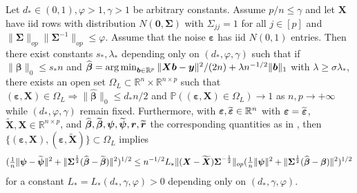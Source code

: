 \documentclass[11pt]{amsart}
\numberwithin{equation}{section}
\numberwithin{equation}{section}
\def\argmin{\mathop{\rm arg\, min}}
\def\argmin{\mathop{\rm arg\, min}}
\def\real{{\mathbb{R}}}
\def\R{{\real}}
\def\P{{\mathbb{P}}}
\def\mathbold{\boldsymbol} %
\def\bb{\mathbold{b}}\def\bhat{\widehat{b}}\def\btil{\widetilde{b}}
\def\br{\mathbold{r}}\def\rhat{\widehat{r}}\def\rtil{\widetilde{r}}\def\rbar{{\overline r}}\def\brbar{{\overline \br}}
\def\bX{\mathbold{X}}\def\hbX{{\widehat{\bX}}}\def\tbX{{\widetilde{\bX}}}\def\bXbar{{\overline \bX}}
\def\by{\mathbold{y}}\def\yhat{\widehat{y}}\def\ytil{\widetilde{y}}\def\ybar{{\overline y}}\def\vby{{\bf y}}
\def\bbeta{\mathbold{\beta}}\def\betahat{\widehat{\beta}}\def\hbeta{\widehat{\beta}}
\def\hbbeta{{{\widehat{\bbeta}}}}
\def\tbbeta{\widetilde{\bbeta}}
\def\ep{\varepsilon}\def\eps{\epsilon}\def\veps{\varepsilon}
\def\bep{ {\mathbold{\ep} }}
\def\bSigma{\mathbold{\Sigma}}\def\hbSigma{{\widehat{\bSigma}}}
\def\bpsi{\mathbold{\psi}}\def\psihat{\widehat{\psi}}\def\hpsi{\widehat{\psi}}
\def\argmin{\mathop{\rm arg\, min}}
\begin{document}
\begin{proposition}
    \label{prop:Omega_L}
    Let $d_*\in(0,1),\varphi>1,\gamma>1$ be arbitrary constants.
    Assume $p/n\le \gamma$ and
    let $\bX$ have iid rows with distribution $N(\mathbf 0,\bSigma)$
    with $\Sigma_{jj}=1$ for all $j\in[p]$ and
    $\|\bSigma\|_{op}\|\bSigma^{-1}\|_{op}\le \varphi$.
    Assume that the noise $\bep$ has iid $N(0,1)$ entries.
    Then there exist constants $s_*,\lambda_*$ depending only
    on $(d_*,\varphi,\gamma)$
    such that
    if $\|\bbeta\|_0\le s_*n$ and $\hbbeta=\argmin_{\bb\in\R^p}
    \|\bX\bb-\by\|^2/(2n) + \lambda n^{-1/2}\|\bb\|_1$
    with $\lambda\ge \sigma \lambda_*$, there exists
    an open set $\Omega_L\subset \R^n\times \R^{n\times p}$ 
    such that
    $(\bep,\bX)\in\Omega_L\Rightarrow \|\hbbeta\|_0\le d_*n/2$
    and $\P((\bep,\bX)\in\Omega_L)\to 1$ as
    $n,p\to+\infty$ while $(d_*,\varphi,\gamma)$ remain fixed.
    Furthermore, 
    with $\bep,\tbep\in\R^n$ with $\bep=\tbep$,
    $\tbX,\bX\in\R^{n\times p}$,
    and $\hbbeta,\tbbeta,\bpsi,\tbpsi, \br, \tbr$
    the corresponding quantities as in ,
    then 
    $\{(\bep,\bX),
    (\bep,\tbX)\}
    \subset\Omega_L$ implies
    \begin{equation}
    (\tfrac1n\|\bpsi - \tbpsi\|^2 +
    \|\bSigma^{\frac12}(\hbbeta-\tbbeta)\|^2)^{1/2}
    \le
    n^{-1/2}
    L_*
    \|(\bX-\tbX)\bSigma^{-\frac12}\|_{op}
    (\tfrac1n\|\bpsi\|^2 + \|\bSigma^{\frac12}(\hbbeta-\bbeta)\|^2)^{1/2}
    \label{eq:lipschitz-condition-lasso-new}
    \end{equation}
    for a constant $L_* = L_*(d_*,\gamma,\varphi)>0$ depending
    only on $(d_*,\gamma,\varphi)$.
\end{proposition}
\end{document}
